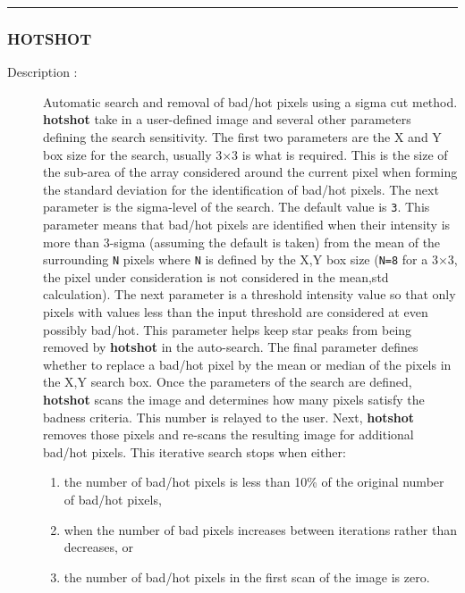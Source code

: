 \hrule
\subsubsection*{\label{HOTSHOT}HOTSHOT}

\begin{description}

\item[Description :] Automatic search and removal of bad/hot pixels
using a sigma cut method.  {\bf hotshot} take in a user-defined image
and several other parameters defining the search sensitivity.  The
first two parameters are the X and Y box size for the search, usually
3$\times$3 is what is required.  This is the size of the sub-area of
the array considered around the current pixel when forming the standard
deviation for the identification of bad/hot pixels.  The next parameter
is the sigma-level of the search.  The default value is {\tt 3}.  This
parameter means that bad/hot pixels are identified when their intensity
is more than 3-sigma (assuming the default is taken) from the mean of
the surrounding {\tt N} pixels where {\tt N} is defined by the X,Y box
size ({\tt N=8} for a 3$\times$3, the pixel under consideration is not
considered in the mean,std calculation).  The next parameter is a
threshold intensity value so that only pixels with values less than the
input threshold are considered at even possibly bad/hot.  This
parameter helps keep star peaks from being removed by {\bf hotshot} in
the auto-search.  The final parameter defines whether to replace a
bad/hot pixel by the mean or median of the pixels in the X,Y search
box.  Once the parameters of the search are defined, {\bf hotshot}
scans the image and determines how many pixels satisfy the badness
criteria.  This number is relayed to the user.  Next, {\bf hotshot}
removes those pixels and re-scans the resulting image for additional
bad/hot pixels.  This iterative search stops when either:

\begin{enumerate}

\item the number of bad/hot pixels is less than 10\% of the original
number of bad/hot pixels,

\item when the number of bad pixels increases between iterations rather
than decreases, or

\item the number of bad/hot pixels in the first scan of the image is zero.


\end{enumerate}
\end{description}
